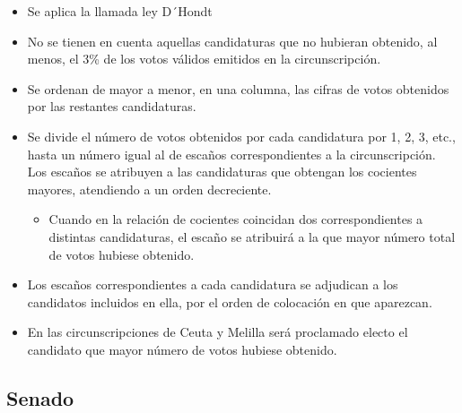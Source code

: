 \documentclass[12pt,a4paper,]{book}
\providecommand{\tightlist}{%
  \setlength{\itemsep}{0pt}\setlength{\parskip}{0pt}}
\numberwithin{dummy}{section}
\theoremstyle{ocrenumbox}
\theoremstyle{blacknumex}
\theoremstyle{blacknumbox}
\theoremstyle{ocrenum}
\theoremstyle{ocrenum}
\begin{document}
\begin{itemize}
\item
  Se aplica la llamada ley D´Hondt
\item
  No se tienen en cuenta aquellas candidaturas que no hubieran obtenido,
  al menos, el 3\% de los votos válidos emitidos en la circunscripción.
\item
  Se ordenan de mayor a menor, en una columna, las cifras de votos
  obtenidos por las restantes candidaturas.
\item
  Se divide el número de votos obtenidos por cada candidatura por 1, 2,
  3, etc., hasta un número igual al de escaños correspondientes a la
  circunscripción. Los escaños se atribuyen a las candidaturas que
  obtengan los cocientes mayores, atendiendo a un orden decreciente.

  \begin{itemize}
  \tightlist
  \item
    Cuando en la relación de cocientes coincidan dos correspondientes a
    distintas candidaturas, el escaño se atribuirá a la que mayor número
    total de votos hubiese obtenido.
  \end{itemize}
\item
  Los escaños correspondientes a cada candidatura se adjudican a los
  candidatos incluidos en ella, por el orden de colocación en que
  aparezcan.
\item
  En las circunscripciones de Ceuta y Melilla será proclamado electo el
  candidato que mayor número de votos hubiese obtenido.
\end{itemize}

\hypertarget{senado}{%
\subsection{Senado}\label{senado}}
\end{document}
